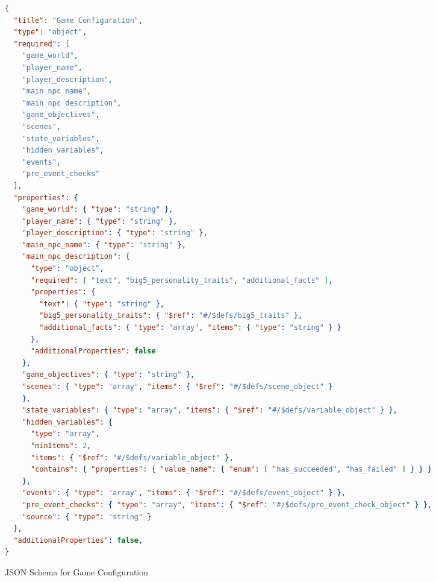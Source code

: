 \begin{figure*}[!htp]
\centering
\small
\begin{minipage}{0.95\textwidth}
\begin{lstlisting}[language=json]
{
  "title": "Game Configuration",
  "type": "object",
  "required": [
    "game_world",
    "player_name",
    "player_description",
    "main_npc_name",
    "main_npc_description",
    "game_objectives",
    "scenes",
    "state_variables",
    "hidden_variables",
    "events",
    "pre_event_checks"
  ],
  "properties": {
    "game_world": { "type": "string" },
    "player_name": { "type": "string" },
    "player_description": { "type": "string" },
    "main_npc_name": { "type": "string" },
    "main_npc_description": {
      "type": "object",
      "required": [ "text", "big5_personality_traits", "additional_facts" ],
      "properties": {
        "text": { "type": "string" },
        "big5_personality_traits": { "$ref": "#/$defs/big5_traits" },
        "additional_facts": { "type": "array", "items": { "type": "string" } }
      },
      "additionalProperties": false
    },
    "game_objectives": { "type": "string" },
    "scenes": { "type": "array", "items": { "$ref": "#/$defs/scene_object" }
    },
    "state_variables": { "type": "array", "items": { "$ref": "#/$defs/variable_object" } },
    "hidden_variables": {
      "type": "array",
      "minItems": 2,
      "items": { "$ref": "#/$defs/variable_object" },
      "contains": { "properties": { "value_name": { "enum": [ "has_succeeded", "has_failed" ] } } }
    },
    "events": { "type": "array", "items": { "$ref": "#/$defs/event_object" } },
    "pre_event_checks": { "type": "array", "items": { "$ref": "#/$defs/pre_event_check_object" } },
    "source": { "type": "string" }
  },
  "additionalProperties": false,
}
\end{lstlisting}
\caption{JSON Schema for Game Configuration}
\label{lst:json-schema}
\end{minipage}
\end{figure*}

